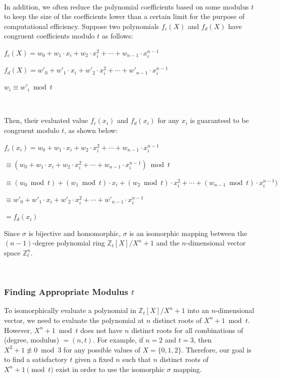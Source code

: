 $ $

 In addition, we often reduce the polynomial coefficients based on some modulus $t$ to keep the size of the coefficients lower than a certain limit for the purpose of computational efficiency. Suppose two polynomials $f_c(X)$ and $f_d(X)$ have congruent coefficients modulo $t$ as follows:

$f_c(X) = w_0 + w_1\cdot x_i + w_2\cdot x_i^2 + \cdots + w_{n-1}\cdot x_i^{n-1}$

$f_d(X) = w'_0 + w'_1\cdot x_i + w'_2\cdot x_i^2 + \cdots + w'_{n-1}\cdot x_i^{n-1} $

$w_i \equiv w'_i \bmod t$

$ $

Then, their evaluated value $f_c(x_i)$ and $f_d(x_i)$ for any $x_i$ is guaranteed to be congruent modulo $t$, as shown below:

$f_c(x_i) = w_0 + w_1\cdot x_i + w_2\cdot x_i^2 + \cdots + w_{n-1}\cdot x_i^{n-1}$

$\equiv (w_0 + w_1\cdot x_i + w_2\cdot x_i^2 + \cdots + w_{n-1}\cdot x_i^{n-1}) \bmod t $

$\equiv (w_0  \bmod t) + (w_1  \bmod t)\cdot x_i + (w_2  \bmod t)\cdot x_i^2 + \cdots + (w_{n-1} \bmod t)\cdot x_i^{n-1}) $

$\equiv w'_0 + w'_1\cdot x_i + w'_2\cdot x_i^2 + \cdots + w'_{n-1}\cdot x_i^{n-1} $

$= f_d(x_i)$

 Since $\sigma$ is bijective and homomorphic, $\sigma$ is an isomorphic mapping between the $(n-1)$-degree polynomial ring $\mathbb{Z}_t[X]/X^n + 1$ and the $n$-dimensional vector space $\mathbb{Z}_t^n$. 


$ $


\subsubsection{Finding Appropriate Modulus $t$} 
\label{subsubsec:poly-vector-transformation-modulus}

To isomorphically evaluate a polynomial in $\mathbb{Z}_t[X]/X^n + 1$ into an $n$-dimensional vector, we need to evaluate the polynomial at $n$ distinct roots of $X^n + 1 \bmod t$. However, $X^n + 1 \bmod t$ does not have $n$ distinct roots for all combinations of (degree, modulus) $ = (n, t)$. For example, if $n = 2$ and $t = 3$, then $X^2+ 1 \not\equiv 0 \bmod 3$ for any possible values of $X = \{0, 1, 2\}$. Therefore, our goal is to find a satisfactory $t$ given a fixed $n$ such that $n$ distinct roots of $X^n + 1 \pmod t$ exist in order to use the isomorphic $\sigma$ mapping. 

